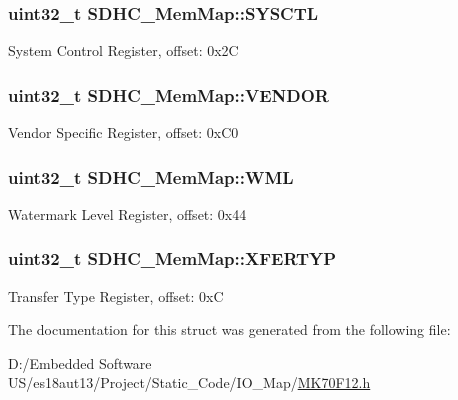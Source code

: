 \subsubsection[{S\+Y\+S\+C\+T\+L}]{\setlength{\rightskip}{0pt plus 5cm}uint32\+\_\+t S\+D\+H\+C\+\_\+\+Mem\+Map\+::\+S\+Y\+S\+C\+T\+L}\label{struct_s_d_h_c___mem_map_ae3204e728de4488f0b3569d1ebac78ae}
System Control Register, offset\+: 0x2\+C \hypertarget{struct_s_d_h_c___mem_map_ac3938ee338b7499c8b1cebed71604299}{}
\subsubsection[{V\+E\+N\+D\+O\+R}]{\setlength{\rightskip}{0pt plus 5cm}uint32\+\_\+t S\+D\+H\+C\+\_\+\+Mem\+Map\+::\+V\+E\+N\+D\+O\+R}\label{struct_s_d_h_c___mem_map_ac3938ee338b7499c8b1cebed71604299}
Vendor Specific Register, offset\+: 0x\+C0 \hypertarget{struct_s_d_h_c___mem_map_a8c1eb45065f5eb8878fc02701f2a6750}{}
\subsubsection[{W\+M\+L}]{\setlength{\rightskip}{0pt plus 5cm}uint32\+\_\+t S\+D\+H\+C\+\_\+\+Mem\+Map\+::\+W\+M\+L}\label{struct_s_d_h_c___mem_map_a8c1eb45065f5eb8878fc02701f2a6750}
Watermark Level Register, offset\+: 0x44 \hypertarget{struct_s_d_h_c___mem_map_ad6c008e044af83f7411e51258f111c48}{}
\subsubsection[{X\+F\+E\+R\+T\+Y\+P}]{\setlength{\rightskip}{0pt plus 5cm}uint32\+\_\+t S\+D\+H\+C\+\_\+\+Mem\+Map\+::\+X\+F\+E\+R\+T\+Y\+P}\label{struct_s_d_h_c___mem_map_ad6c008e044af83f7411e51258f111c48}
Transfer Type Register, offset\+: 0x\+C 

The documentation for this struct was generated from the following file\+:\begin{DoxyCompactItemize}
\item 
D\+:/\+Embedded Software U\+S/es18aut13/\+Project/\+Static\+\_\+\+Code/\+I\+O\+\_\+\+Map/\hyperlink{_m_k70_f12_8h}{M\+K70\+F12.\+h}\end{DoxyCompactItemize}
